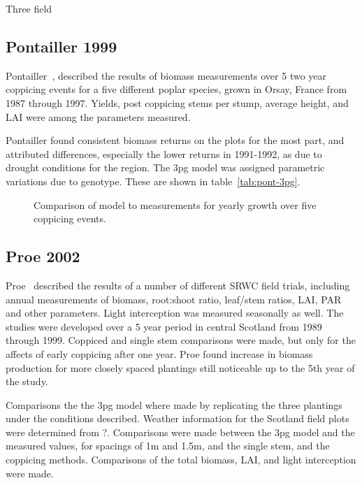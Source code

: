 \documentclass[10pt]{article}
\begin{document}
Three field
\subsection{Pontailler 1999}
\label{sec:pont}

Pontailler~\cite{Pontailler1999}, described the results of biomass
measurements over 5 two year coppicing events for a five different
poplar species, grown in Orsay, France from 1987 through 1997.
Yields, post coppicing stems per stump, average height, and \ac{LAI}
were among the parameters measured.

Pontailler found consistent biomass returns on the plots for the most
part, and attributed differences, especially the lower returns in
1991-1992, as due to drought conditions for the region.  The \ac{3pg}
model was assigned parametric variations due to genotype.  These are
shown in table~\ref{tab:pont-3pg}.

\begin{table}[!ht]
  \centering
  \caption{\ac{3pg} parameter variations of \ac{3pg} among genotypes}
  \label{tab:pont-3pg}
\end{table}

\begin{figure}[!ht]
  \centering

  \caption{Comparison of model to measurements for yearly growth over five
    coppicing events.}
\label{fig:pont-biomass}
\end{figure}


\subsection*{Proe 2002}

Proe~\cite{Proe2002} described  the results  of a number  of different
\ac{SRWC}  field  trials, including  annual  measurements of  biomass,
root:shoot  ratio, leaf/stem  ratios, LAI,  PAR and  other parameters.
Light interception was measured  seasonally as well.  The studies were
developed over a  5 year period in central  Scotland from 1989 through
1999. Coppiced and single stem  comparisons were made, but only for the
affects of  early coppicing  after one year.   Proe found  increase in
biomass production  for more closely spaced  plantings still noticeable
up to the 5th year of the study.

Comparisons the the \ac{3pg} model where made by replicating the three
plantings under the conditions described.  Weather information for the
Scotland field plots were determined from ?.  Comparisons were made
between the \ac{3pg} model and the measured values, for spacings of 1m and
1.5m, and the single stem, and the coppicing methods.  Comparisons of
the total biomass, LAI, and light interception were made.
\end{document}
